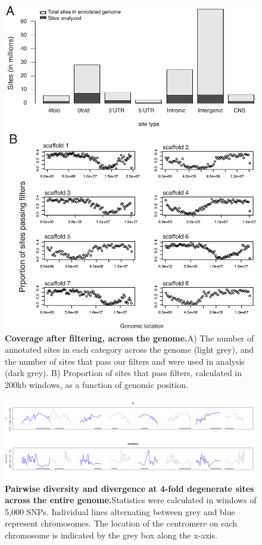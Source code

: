 \begin{figure}[h!]
      \centering
       \includegraphics[width=\linewidth]{Ch2FigS1}
    \caption{\textbf{Coverage after filtering, across the genome.}A) The number of annotated sites in each category across the genome (light grey), and the number of sites that pass our filters and were used in analysis (dark grey). B) Proportion of sites that pass filters, calculated in 200kb windows, as a function of genomic position.}
    \label{fig:figS1}
\end{figure}

\begin{figure}[h!]
      \centering
       \includegraphics[width=\linewidth]{Ch2FigS2.pdf}
    \caption{\textbf{Pairwise diversity and divergence at 4-fold degenerate sites across the entire genome.}Statistics were calculated in windows of 5,000 SNPs. Individual lines alternating between grey and blue represent chromosomes. The location of the centromere on each chromosome is indicated by the grey box along the x-axis.}
    \label{fig:figS2}
\end{figure}

